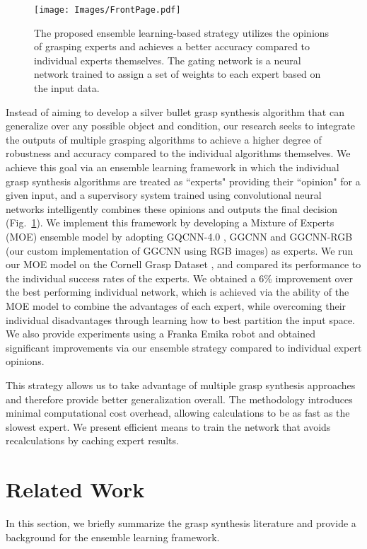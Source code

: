 \documentclass[letterpaper, 10 pt, conference]{ieeeconf}
\begin{document}
\begin{figure}
    \texttt{[image: Images/FrontPage.pdf]}
    \caption{The proposed ensemble learning-based strategy utilizes the opinions of grasping experts and achieves a better accuracy compared to individual experts themselves.  The gating network is a neural network trained to assign a set of weights to each expert based on the input data.}
    \label{fig:figure 1}
\end{figure}

Instead of aiming to develop a silver bullet grasp synthesis algorithm that can generalize over any possible object and condition, our research seeks to integrate the outputs of multiple grasping algorithms to achieve a higher degree of robustness and accuracy compared to the individual algorithms themselves. We achieve this goal via an ensemble learning framework \cite{ensembleSurvey} in which the individual grasp synthesis algorithms are treated as ``experts" providing their ``opinion" for a given input, and a supervisory system trained using convolutional neural networks intelligently combines these opinions and outputs the final decision (Fig.~\ref{fig:figure 1}). We implement this framework by developing a Mixture of Experts (MOE) ensemble model by adopting GQCNN-4.0 \cite{gqcnn_latest}, GGCNN \cite{generative} and GGCNN-RGB (our custom implementation of GGCNN using RGB images) as experts. We run our MOE model on the Cornell Grasp Dataset \cite{planarGrasp1}, and compared its performance to the individual success rates of the experts. We obtained a 6\% improvement over the best performing individual network, which is achieved via the ability of the MOE model to combine the advantages of each expert, while overcoming their individual disadvantages through learning how to best partition the input space. We also provide experiments using a Franka Emika robot and obtained significant improvements via our ensemble strategy compared to individual expert opinions.

This strategy allows us to take advantage of multiple grasp synthesis approaches and therefore provide better generalization overall. The methodology introduces minimal computational cost overhead, allowing calculations to be as fast as the slowest expert. We present efficient means to train the network that avoids recalculations by caching expert results.

\section{Related Work}\label{sec: litreview}
In this section, we briefly summarize the grasp synthesis literature and provide a background for the ensemble learning framework.
\end{document}
